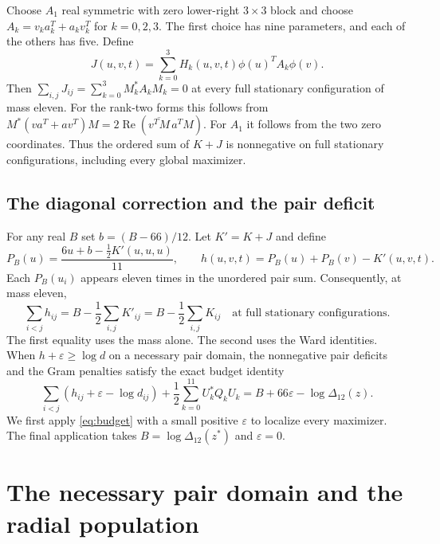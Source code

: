 \documentclass[11pt,letterpaper]{article}
\theoremstyle{remark}
\newcommand{\RePart}{\operatorname{Re}}
\begin{document}
Choose \(A_1\) real symmetric with zero lower-right \(3\times3\) block and
choose \(A_k=v_k a_k^T+a_kv_k^T\) for \(k=0,2,3\). The first choice has
nine parameters, and each of the others has five. Define
\begin{equation}
 J(u,v,t)=\sum_{k=0}^{3} H_k(u,v,t)\phi(u)^T A_k\phi(v).
 \label{eq:ward-correction}
\end{equation}
Then \(\sum_{i,j}J_{ij}=\sum_{k=0}^3 M_k^* A_k M_k=0\) at every full
stationary configuration of mass eleven. For the rank-two forms this
follows from \(M^*(va^T+av^T)M=2\RePart(\overline{v^T M}\,a^T M)\).
For \(A_1\) it follows from the two zero coordinates. Thus the ordered
sum of \(K+J\) is nonnegative on full stationary configurations, including
every global maximizer.

\subsection{The diagonal correction and the pair deficit}
For any real \(B\) set \(b=(B-66)/12\). Let \(K'=K+J\) and define
\begin{equation}
 P_B(u)=\frac{6u+b-\tfrac12 K'(u,u,u)}{11},\qquad
 h(u,v,t)=P_B(u)+P_B(v)-K'(u,v,t).
 \label{eq:pair-h}
\end{equation}
Each \(P_B(u_i)\) appears eleven times in the unordered pair sum.
Consequently, at mass eleven,
\begin{equation}
 \sum_{i<j}h_{ij}
 =B-\frac12\sum_{i,j}K'_{ij}
 =B-\frac12\sum_{i,j}K_{ij}
 \quad\text{at full stationary configurations}.
 \label{eq:kernel-sum}
\end{equation}
The first equality uses the mass alone. The second uses the Ward
identities. When \(h+\varepsilon\ge\log d\) on a necessary pair domain,
the nonnegative pair deficits and the Gram penalties satisfy the exact
budget identity
\begin{equation}
 \sum_{i<j}(h_{ij}+\varepsilon-\log d_{ij})
 +\frac12\sum_{k=0}^{11}U_k^*Q_kU_k
 =B+66\varepsilon-\log\Delta_{12}(z).
 \label{eq:budget}
\end{equation}
We first apply \eqref{eq:budget} with a small positive \(\varepsilon\)
to localize every maximizer. The final application takes
\(B=\log\Delta_{12}(z^*)\) and \(\varepsilon=0\).

\section{The necessary pair domain and the radial population}
\label{sec:radial-domain}
\end{document}

